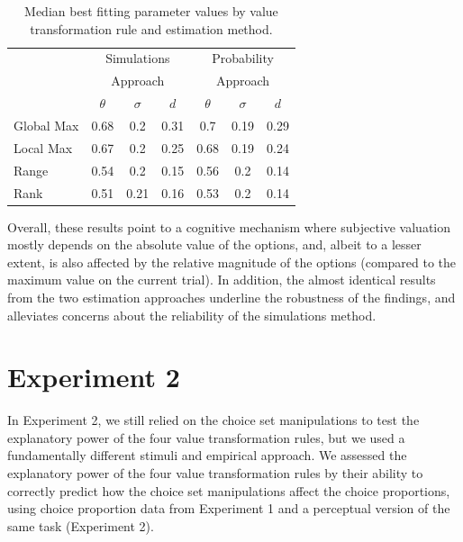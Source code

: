 \documentclass[11pt,a4paper]{article}
\begin{document}
\begin{table}[h]
\centering
\caption{Median best fitting parameter values by value transformation rule and estimation method.}
\begin{tabular}{lcccccc}
\toprule 
\multirow{2}{*}{} & \multicolumn{3}{c}{Simulations} & \multicolumn{3}{c}{Probability} \\
\multirow{2}{*}{} & \multicolumn{3}{c}{Approach} & \multicolumn{3}{c}{Approach} \\

\cmidrule(l){2-4} \cmidrule(l){5-7}
 & $\theta$ & $\sigma$ & $d$ & $\theta$ & $\sigma$ & $d$ \\
\midrule
Global Max & 0.68 & 0.2  & 0.31 & 0.7 & 0.19 & 0.29 \\
Local Max & 0.67 & 0.2 & 0.25 & 0.68 & 0.19 & 0.24\\
Range & 0.54 & 0.2 & 0.15 & 0.56 & 0.2 & 0.14\\
Rank & 0.51 & 0.21 & 0.16 & 0.53 & 0.2 & 0.14\\
\bottomrule
\end{tabular}
\label{table:chap1res2}
\end{table}



Overall, these results point to a cognitive mechanism where subjective valuation mostly depends on the absolute value of the options, and, albeit to a lesser extent, is also affected by the relative magnitude of the options (compared to the maximum value on the current trial). In addition, the almost identical results from the two estimation approaches underline the robustness of the findings, and alleviates concerns about the reliability of the simulations method.

 
 
\section{Experiment 2}

In Experiment 2, we still relied on the choice set manipulations to test the explanatory power of the four value transformation rules, but we used a fundamentally different stimuli and empirical approach. We assessed the explanatory power of the four value transformation rules by their ability to correctly predict how the choice set manipulations affect the choice proportions, using choice proportion data from Experiment 1 and a perceptual version of the same task (Experiment 2). 
\end{document}
